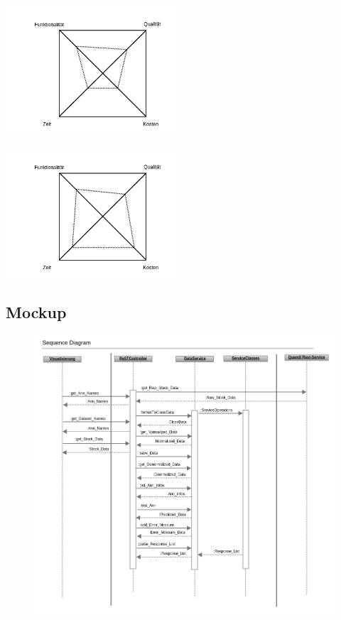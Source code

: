 \begin{minipage}[c]{0.5\textwidth}

\includegraphics[width=0.49\textwidth]{mag_viereck_not_linear.png}

\end{minipage}
\begin{minipage}[c]{0.5\textwidth}
\includegraphics[width=0.49\textwidth]{mag_viereck_linear.png}
\end{minipage}



\subsection{Mockup}
\label{subsection:Mockup} 

\begin{figure}
\includegraphics[width=15cm]{sequence_dia_rest_env.png}
\end{figure}


